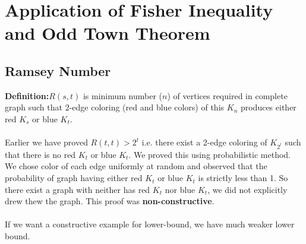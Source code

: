 \section{Application of Fisher Inequality and Odd Town Theorem}
\subsection{Ramsey Number}
\textbf{Definition:}$R(s,t)$ is minimum number ($n$) of vertices required in complete graph such that 2-edge coloring (red and blue colors) of this $K_n$ produces either red $K_s$ or blue $K_t$.\\\\
Earlier we have proved $R(t,t)>2^t$ i.e. there exist a 2-edge coloring of $K_{2^t}$ such that there is no red $K_t$ or blue $K_t$. We proved this using probabilistic method. We chose color of each edge uniformly at random and observed that the probability of graph having either red $K_t$ or blue $K_t$ is strictly less than 1. So there exist a graph with neither has red $K_t$ nor blue $K_t$, we did not explicitly drew thew the graph. This proof was \textbf{non-constructive}.\\\\
If we want a constructive example for lower-bound, we have much weaker lower bound.
